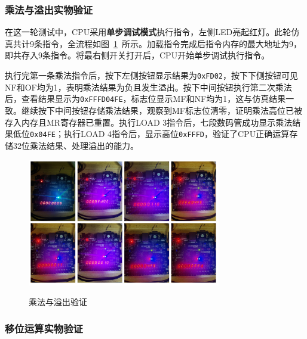 \documentclass[lang=cn,a4paper,newtx]{elegantpaper}
\begin{document}
\subsubsection{乘法与溢出实物验证}

在这一轮测试中，CPU采用\textbf{单步调试模式}执行指令，左侧LED亮起红灯。此轮仿真共计9条指令，全流程如图~\ref{fig:FPGA_mul}~所示。加载指令完成后指令内存的最大地址为9，即共存入9条指令。将最右侧开关打开后，CPU开始单步调试执行指令。

执行完第一条乘法指令后，按下左侧按钮显示结果为\texttt{0xFD02}，按下下侧按钮可见NF和OF均为1，表明乘法结果为负且发生溢出。按下中间按钮执行第二次乘法后，查看结果显示为\texttt{0xFFFD04FE}，标志位显示MF和NF均为1，这与仿真结果一致。继续按下中间按钮存储乘法结果，观察到MF标志位清零，证明乘法高位已被存入内存且MR寄存器已重置。执行LOAD 3指令后，七段数码管成功显示乘法结果低位\texttt{0x04FE}；执行LOAD 4指令后，显示高位\texttt{0xFFFD}，验证了CPU正确运算存储32位乘法结果、处理溢出的能力。
\begin{figure}[htbp]
  \centering
  \caption{乘法与溢出验证}
  \includegraphics[width = 0.75\textwidth]{figure/mul_verification.pdf}
  \label{fig:FPGA_mul}
\end{figure}

\subsubsection{移位运算实物验证}
\end{document}
